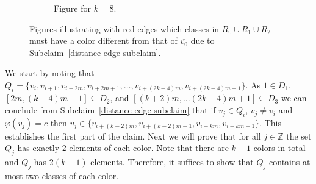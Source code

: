 \documentclass[a4paper,10pt,hidelinks]{amsart}
\newenvironment{claimproof}[1][\proofname]{\proof[#1]\renewcommand{\qedsymbol}{$\blacksquare$}}{\endproof}
\newenvironment{subclaimproof}[1][\proofname]{\proof[#1]\renewcommand{\qedsymbol}{$\blacklozenge$}}{\endproof}
\theoremstyle{definition}
\begin{document}
\begin{claimproof}[Proof of Claim~\ref{structure-claim} when $k \in \{6,8\}$]
\begin{subclaimproof}
\begin{figure}[H]
\begin{subfigure}{0.4\textwidth}


                    \caption{\label{red-edge-fig-8} Figure for $k=8$.}
                \end{subfigure}


                \caption{\label{red-edge-fig} Figures illustrating with red edges which classes in $R_0\cup R_1 \cup R_2$ must have a color different from that of $\overline{v_0}$ due to Subclaim~\ref{distance-edge-subclaim}. }
            \end{figure}



            We start by noting that $Q_i = \{\overline{v_{i}}, \overline{v_{i+1}}, \overline{v_{i+2m}}, \overline{v_{i+2m+1}}, \dots, \overline{v_{i + (2k - 4)m}}, \overline{v_{i+ (2k - 4)m+1}}\}$. As $1 \in D_1$, $[2m, (k - 4)m + 1] \subseteq D_2$, and $[(k + 2)m, \dots (2k - 4)m + 1] \subseteq D_3$ we can conclude from Subclaim~\ref{distance-edge-subclaim} that if $\overline{v_j} \in Q_i$, $\overline{v_{j}} \neq \overline{v_{i}}$ and $\varphi(\overline{v_j}) = c$ then $\overline{v_{j}} \in \{\overline{v_{i + (k - 2)m}}, \overline{v_{i + (k - 2)m + 1}}, \overline{v_{i + km}}, \overline{v_{i + km + 1}}\}$. This establishes the first part of the claim.
            Next we will prove that for all $j \in \mathbb{Z}$ the set $Q_j$ has exactly $2$ elements of each color. Note that there are $k - 1$ colors in total and $Q_j$ has $2(k - 1)$ elements. Therefore, it suffices to show that $Q_j$ contains at most two classes of each color.


\end{subclaimproof}
\end{claimproof}
\end{document}
